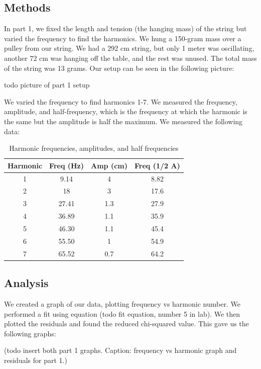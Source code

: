 \documentclass[11pt]{article}
\begin{document}
    \subsection{Methods}\label{subsec:part_1_methods}
    In part 1, we fixed the length and tension (the hanging mass) of the string but varied the frequency to find the harmonics. We hung a 150-gram mass over a pulley from our string. We had a 292 cm string, but only 1 meter was oscillating, another 72 cm was hanging off the table, and the rest was unused. The total mass of the string was 13 grams. Our setup can be seen in the following picture:

    {todo picture of part 1 setup}

    We varied the frequency to find harmonics 1-7. We measured the frequency, amplitude, and half-frequency, which is the frequency at which the harmonic is the same but the amplitude is half the maximum. We measured the following data:

    \begin{table}[h]
    \centering
    \begin{tabular}{|c|c|c|c|}
    \hline
    \textbf{Harmonic} & \textbf{Freq (Hz)} & \textbf{Amp (cm)} & \textbf{Freq (1/2 A)} \\
    \hline
    1 & 9.14 & 4 & 8.82 \\
    2 & 18 & 3 & 17.6 \\
    3 & 27.41 & 1.3 & 27.9 \\
    4 & 36.89 & 1.1 & 35.9 \\
    5 & 46.30 & 1.1 & 45.4 \\
    6 & 55.50 & 1 & 54.9 \\
    7 & 65.52 & 0.7 & 64.2 \\
    \hline
    \end{tabular}
    \caption{Harmonic frequencies, amplitudes, and half frequencies}
    \label{tab:harmonics}
    \end{table}
    
    
    \subsection{Analysis}\label{subsec:part_1_analysis}
    We created a graph of our data, plotting frequency vs harmonic number. We performed a fit using equation (todo fit equation, number 5 in lab). We then plotted the residuals and found the reduced chi-squared value. This gave us the following graphs:

    (todo insert both part 1 graphs. Caption: frequency vs harmonic graph and residuals for part 1.)
\end{document}

